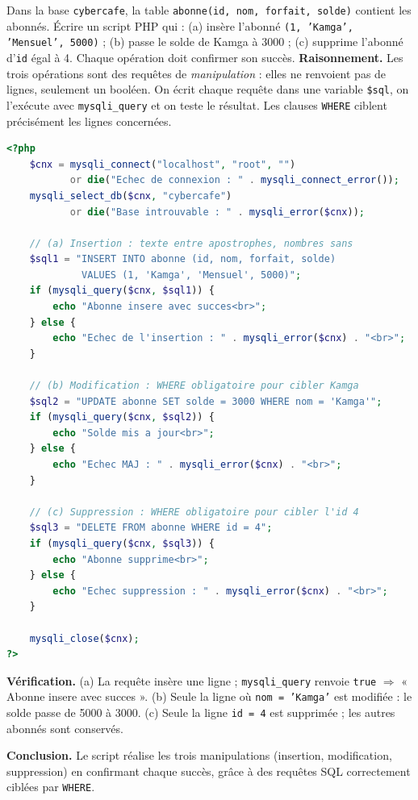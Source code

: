 \documentclass[11pt]{article}
\begin{document}
\begin{exoresolu}
Dans la base \texttt{cybercafe}, la table \texttt{abonne(id, nom, forfait, solde)} contient les abonnés. Écrire un script PHP qui : (a) insère l'abonné \texttt{(1, 'Kamga', 'Mensuel', 5000)} ; (b) passe le solde de Kamga à 3000 ; (c) supprime l'abonné d'\texttt{id} égal à 4. Chaque opération doit confirmer son succès.
\tcblower
\textbf{Raisonnement.} Les trois opérations sont des requêtes de \emph{manipulation} : elles ne renvoient pas de lignes, seulement un booléen. On écrit chaque requête dans une variable \texttt{\$sql}, on l'exécute avec \texttt{mysqli\_query} et on teste le résultat. Les clauses \texttt{WHERE} ciblent précisément les lignes concernées.

\begin{lstlisting}[language=Php]
<?php
    $cnx = mysqli_connect("localhost", "root", "")
           or die("Echec de connexion : " . mysqli_connect_error());
    mysqli_select_db($cnx, "cybercafe")
           or die("Base introuvable : " . mysqli_error($cnx));

    // (a) Insertion : texte entre apostrophes, nombres sans
    $sql1 = "INSERT INTO abonne (id, nom, forfait, solde)
             VALUES (1, 'Kamga', 'Mensuel', 5000)";
    if (mysqli_query($cnx, $sql1)) {
        echo "Abonne insere avec succes<br>";
    } else {
        echo "Echec de l'insertion : " . mysqli_error($cnx) . "<br>";
    }

    // (b) Modification : WHERE obligatoire pour cibler Kamga
    $sql2 = "UPDATE abonne SET solde = 3000 WHERE nom = 'Kamga'";
    if (mysqli_query($cnx, $sql2)) {
        echo "Solde mis a jour<br>";
    } else {
        echo "Echec MAJ : " . mysqli_error($cnx) . "<br>";
    }

    // (c) Suppression : WHERE obligatoire pour cibler l'id 4
    $sql3 = "DELETE FROM abonne WHERE id = 4";
    if (mysqli_query($cnx, $sql3)) {
        echo "Abonne supprime<br>";
    } else {
        echo "Echec suppression : " . mysqli_error($cnx) . "<br>";
    }

    mysqli_close($cnx);
?>
\end{lstlisting}

\textbf{Vérification.} (a) La requête insère une ligne ; \texttt{mysqli\_query} renvoie \texttt{true} $\Rightarrow$ « Abonne insere avec succes ». (b) Seule la ligne où \texttt{nom = 'Kamga'} est modifiée : le solde passe de 5000 à 3000. (c) Seule la ligne \texttt{id = 4} est supprimée ; les autres abonnés sont conservés.

\textbf{Conclusion.} Le script réalise les trois manipulations (insertion, modification, suppression) en confirmant chaque succès, grâce à des requêtes SQL correctement ciblées par \texttt{WHERE}.
\end{exoresolu}
\end{document}
